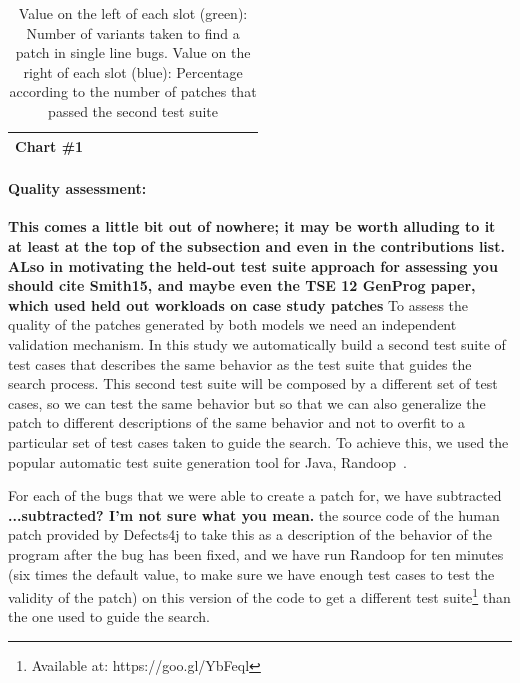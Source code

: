 \documentclass[conference]{IEEEtran}
\newcommand{\ra}[1]{\renewcommand{\arraystretch}{#1}}
\newcommand{\todo}[1]
  {{\scriptsize \textbf{\color{red} {#1}}}}
\begin{document}
{\begin{table}
{\begin{tabular}{|r|rr|rr|rr|rr|rr|rr|}
 Chart \#1 & \color{OliveGreen}{1.8}&\color{blue}{0\%} & \color{OliveGreen}{7.3}&\color{blue}{0\%} & \color{OliveGreen}{4.9}&\color{blue}{0\%} & \color{OliveGreen}{19.0}&\color{blue}{0\%} & \color{OliveGreen}{2.2}&\color{blue}{0\%} & \color{OliveGreen}{4.8}&\color{blue}{0\%} \\

\hline
 
\end{tabular}
}
\ra{1.3}
		\caption{Value on the left of each slot (green): Number of variants taken to find a patch in single line bugs. Value on the right of each slot (blue): Percentage according to the number of patches that passed the second test suite}\label{tab:singleLineBugs}
\end{table}


\paragraph{Quality assessment:}\todo{This comes a little bit out of nowhere; it
  may be worth alluding to it at least at the top of the subsection and even in
  the contributions list.  ALso in motivating the held-out test suite approach
  for assessing you should cite Smith15, and maybe even the TSE 12 GenProg
  paper, which used held out workloads on case study patches}
To assess the quality of the patches generated by both models we need an
independent validation mechanism. In this study we automatically build a second
test suite of test cases that describes the same behavior as the test suite that
guides the search process. This second test suite will be composed by a
different set of test cases, so we can test the same behavior but so that we can
also generalize the patch to different descriptions of the same behavior and not
to overfit to a particular set of test cases taken to guide the search. To
achieve this, we used the popular automatic test suite generation tool for Java,
Randoop~\cite{pacheco07}. 

For each of the bugs that we were able to create a patch for, we have
subtracted\todo{...subtracted?  I'm not sure what you mean.}
the source code of the human patch provided by Defects4j to take this as a
description of the behavior of the program after the bug has been fixed, and we
have run Randoop for ten minutes (six times the default value, to make sure we
have enough test cases to test the validity of the patch) on this version of the
code to get a different test suite\footnote{Available at: https://goo.gl/YbFeql}
than the one used to guide the search.  

}
\end{document}
